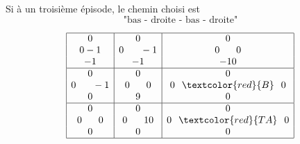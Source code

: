 \documentclass{beamer}
\begin{document}
\begin{frame}
Si à un troisième épisode, le chemin choisi est $$\text{"bas - droite - bas - droite"}$$ 
\pause
\begin{figure}[!ht]
\centering
$$\begin{array}{|c|c|c|}
\hline
0                      & 0                           & 0 \\
0 -1 & 0 \hspace*{0.6cm} -1 & 0\hspace*{0.6cm}0 \\
-1          & -1          & -10 \\
\hline
0          & 0                            & 0 \\
0\hspace*{0.6cm}-1   & 0\hspace*{0.6cm} 0                  & 0\hspace*{0.25cm}\textcolor{red}{B}\hspace*{0.25cm} 0 \\
0           & 9         & 0 \\
\hline
0          & 0                         & 0\\
0\hspace*{0.6cm} 0                     & 0\hspace*{0.6cm}10                & 0\hspace*{0.25cm}\textcolor{red}{T A}\hspace*{0.25cm} 0 \\
0                            & 0        & 0 \\
\hline
\end{array}
$$
\end{figure}
\end{frame}
\end{document}
